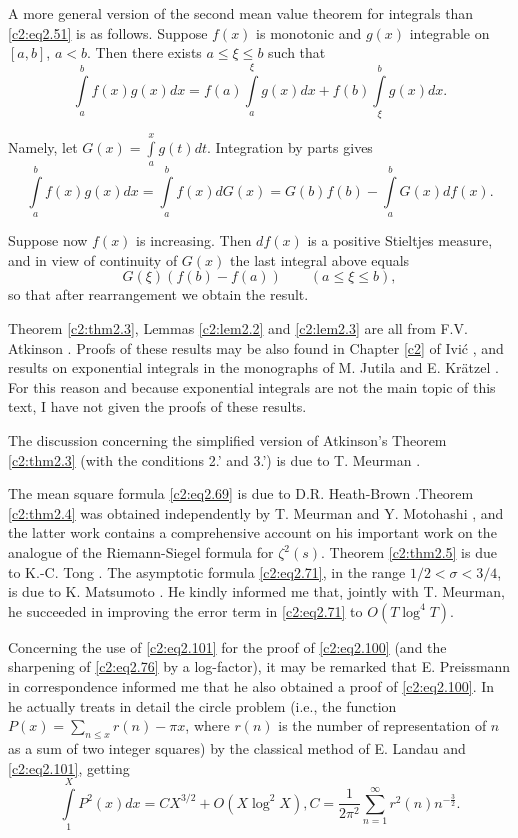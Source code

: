 A more general version of the second mean value theorem for integrals
than \eqref{c2:eq2.51} is as follows. Suppose $f(x)$ is monotonic and
$g(x)$ integrable on $[a, b]$, $a < b$. Then there exists $a \leq \xi
\leq b$ such that
$$ 
\int\limits_a^b f(x) g(x) dx= f(a) \int\limits_a^\xi g(x) dx + f(b)
\int\limits_\xi^b  g(x) dx.
$$

Namely, let $G(x)= \displaystyle{\int\limits_a^x} g(t)
dt$. Integration by parts gives
$$
\int\limits_a^b f(x) g(x) dx = \int\limits_a^b f(x) dG(x) = G(b) f(b)
- \int\limits_a^b G(x) df(x).
$$

Suppose now $f(x)$ is increasing. Then $df(x)$ is a positive Stieltjes
measure, and in view of continuity of $G(x)$ the last integral above
equals 
$$
G(\xi) (f(b)- f(a))\qquad (a \leq \xi \leq b),
$$
so that after rearrangement we obtain the result.

Theorem \ref{c2:thm2.3}, Lemmas \ref{c2:lem2.2} and \ref{c2:lem2.3}
are all from F.V. Atkinson \cite{Atkinson2}. Proofs of these results may be
also found in Chapter \ref{c2} of Ivi\'c \cite{Ivic1}, and results on exponential
integrals in the monographs of M. Jutila \cite{Jutila9}  and E. Kr\"atzel
\cite{Kratzel1}. For this reason and because exponential integrals are not
the main topic of this text, I have not given the proofs of these
results.

The discussion concerning the simplified version of Atkinson's Theorem
\ref{c2:thm2.3} (with the conditions 2.' and 3.') is due to T. Meurman
\cite{Meurman1}. 

The mean square formula \eqref{c2:eq2.69} is due to D.R. Heath-Brown
\cite{Heath-Brown2}.\pageoriginale Theorem \ref{c2:thm2.4} was obtained
independently by T. Meurman \cite{Meurman3} and Y. Motohashi \cite{Motohashi4}, and
the latter work contains a comprehensive account on his important work
on the analogue of the Riemann-Siegel formula for $\zeta^2
(s)$. Theorem \ref{c2:thm2.5} is due to K.-C. Tong \cite{Tong1}. The
asymptotic formula \eqref{c2:eq2.71}, in the range $1/2 < \sigma <
3/4$, is due to K. Matsumoto \cite{Matsumoto1}. He kindly informed me that,
jointly with T. Meurman, he succeeded in improving the error term in
\eqref{c2:eq2.71} to $O(T \log^4 T)$.

Concerning the use of \eqref{c2:eq2.101} for the proof of
\eqref{c2:eq2.100} (and the sharpening of \eqref{c2:eq2.76} by a
log-factor), it may be remarked that E. Preissmann in correspondence
informed me that he also obtained a proof of \eqref{c2:eq2.100}. In
\cite{Preissmann2} he actually treats in detail the circle problem (i.e., the
function $P(x)= \displaystyle{\sum_{n \leq x} r(n)}- \pi x$, where
$r(n)$ is the number of representation of $n$ as a sum of two integer
squares) by the classical method of E. Landau \cite{Landau1} and
\eqref{c2:eq2.101}, getting
$$
\int\limits_1^X P^2 (x) dx = CX^{3/2} + O (X \log^2 X), C =
\frac{1}{2\pi^2} \sum_{n=1}^\infty r^2 (n) n^{- \frac{3}{2}}.
$$  

